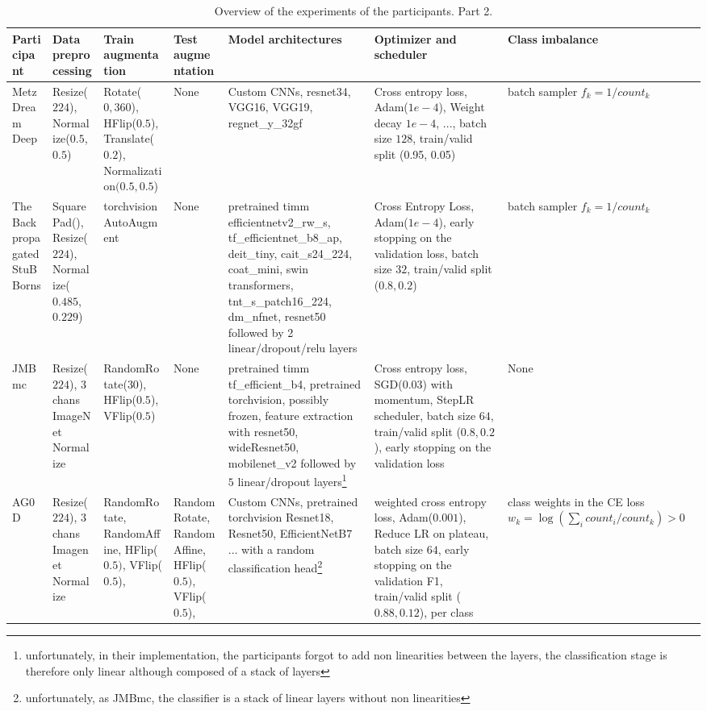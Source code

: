 \documentclass{article}
\begin{document}
{\begin{landscape}
		\begin{table}
			\begin{tabular}{p{3cm}|p{3cm}|p{3cm}|p{3cm}|p{3cm}|p{3cm}|p{3cm}}
			Participant & Data preprocessing & Train augmentation & Test augmentation & Model architectures & Optimizer and scheduler & Class imbalance \\
			\hline
			Metz Dream Deep & 
			Resize($224$), Normalize($0.5$, $0.5$) & 
				Rotate($0, 360$), HFlip($0.5$), Translate($0.2$), Normalization$(0.5, 0.5$)&
			None& Custom CNNs, resnet34, VGG16, VGG19, regnet\_y\_32gf
			&
				Cross entropy loss, Adam($1e-4$), Weight decay $1e-4$, ..., batch size $128$, train/valid split (0.95, 0.05)&
			batch sampler $f_k=1/count_k$\\
			\hline
			The Backpropagated StuBBorns & 
				SquarePad(), Resize($224$), Normalize($0.485$, $0.229$) & torchvision AutoAugment &None
			& pretrained timm efficientnetv2\_rw\_s, tf\_efficientnet\_b8\_ap, deit\_tiny, cait\_s24\_224, coat\_mini, swin transformers, tnt\_s\_patch16\_224, dm\_nfnet, resnet50 followed by 2 linear/dropout/relu layers
				& Cross Entropy Loss, Adam($1e-4$), early stopping on the validation loss, batch size $32$, train/valid split ($0.8, 0.2$) 
			&
			batch sampler $f_k=1/count_k$\\
			\hline
			JMBmc & 
				Resize($224$), 3 chans ImageNet Normalize & RandomRotate($30$), HFlip($0.5$), VFlip($0.5$)
			& None
				& pretrained timm tf\_efficient\_b4, pretrained torchvision, possibly frozen, feature extraction with resnet50, wideResnet50, mobilenet\_v2 followed by $5$ linear/dropout layers\footnote{unfortunately, in their implementation, the participants forgot to add non linearities between the layers, the classification stage is therefore only linear although composed of a stack of layers}
				& Cross entropy loss, SGD($0.03$) with momentum, StepLR scheduler, batch size $64$, train/valid split ($0.8, 0.2$), early stopping on the validation loss
			&None
			\\
			\hline
			AG0D & 
				Resize($224$), 3 chans Imagenet Normalize & RandomRotate, RandomAffine, HFlip($0.5)$, VFlip($0.5$), 
			& RandomRotate, RandomAffine, HFlip($0.5)$, VFlip($0.5$), 
				& Custom CNNs, pretrained torchvision Resnet18, Resnet50, EfficientNetB7 ... with a random classification head\footnote{unfortunately, as JMBmc, the classifier is a stack of linear layers without non linearities}
				& weighted cross entropy loss, Adam($0.001$), Reduce LR on plateau, batch size $64$, early stopping on the validation F1, train/valid split ($0.88, 0.12$), per class
				& class weights in the CE loss $w_k=\log(\sum_i count_i/count_k) > 0$
			\\
			\hline
		\end{tabular}
			\caption{Overview of the experiments of the participants. Part 2. \label{table:overview2}}
	\end{table}


\end{landscape}}
\end{document}
